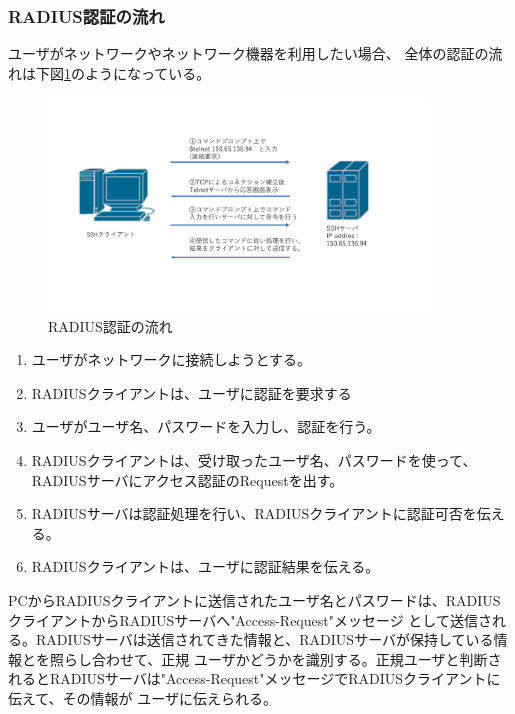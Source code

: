 \documentclass[11pt,a4j,titlepage]{jreport}
\begin{document}
\subsubsection*{RADIUS認証の流れ}
ユーザがネットワークやネットワーク機器を利用したい場合、
全体の認証の流れは下図\ref{RADIUS_Authentication}のようになっている。
\begin{figure}[h]
    \begin{center}
        \includegraphics[width=0.9\textwidth, page=19]{graphs/network_archtecture.pdf}
        \caption{RADIUS認証の流れ}
        \label{RADIUS_Authentication}
    \end{center}
\end{figure}
\begin{enumerate}
    \setlength{\parskip}{0.1cm} %
    \setlength{\itemsep}{0.1cm} 

    \item ユーザがネットワークに接続しようとする。
    \item RADIUSクライアントは、ユーザに認証を要求する
    \item ユーザがユーザ名、パスワードを入力し、認証を行う。
    \item RADIUSクライアントは、受け取ったユーザ名、パスワードを使って、RADIUSサーバにアクセス認証のRequestを出す。
    \item RADIUSサーバは認証処理を行い、RADIUSクライアントに認証可否を伝える。
    \item RADIUSクライアントは、ユーザに認証結果を伝える。

\end{enumerate}




PCからRADIUSクライアントに送信されたユーザ名とパスワードは、RADIUSクライアントからRADIUSサーバへ"Access-Request"メッセージ
として送信される。RADIUSサーバは送信されてきた情報と、RADIUSサーバが保持している情報とを照らし合わせて、正規
ユーザかどうかを識別する。正規ユーザと判断されるとRADIUSサーバは"Access-Request"メッセージでRADIUSクライアントに伝えて、その情報が
ユーザに伝えられる。
\\
\fi
\end{document}
